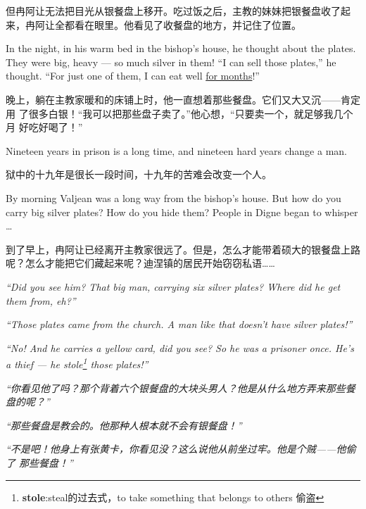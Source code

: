 \documentclass[fontset=ubuntu, zihao=5]{ctexart}
\begin{document}
\begin{paracol}{2}
  \switchcolumn
  但冉阿让无法把目光从银餐盘上移开。吃过饭之后，主教的妹妹把银餐盘收了起来，冉阿让全都看在眼里。他看见了收餐盘的地方，并记住了位置。

  \switchcolumn*

  In the night, in his warm bed in the bishop's house, he thought about the
  plates. They were big, heavy --- so much silver in them! ``I can sell
  those plates,'' he thought. ``For just one of them, I can eat well
  \uline{for months}!''

  \switchcolumn

  晚上，躺在主教家暖和的床铺上时，他一直想着那些餐盘。它们又大又沉——肯定用
  了很多白银！“我可以把那些盘子卖了。”他心想，“只要卖一个，就足够我几个月
  好吃好喝了！”

  \switchcolumn*

  Nineteen years in prison is a long time, and nineteen hard years change a man.

  \switchcolumn

  狱中的十九年是很长一段时间，十九年的苦难会改变一个人。

  \switchcolumn*

  \sectionbreak

  By morning Valjean was a long way from the bishop's house. But how do you carry big silver plates? How do you hide them? People in Digne began to whisper \ldots{}

  \switchcolumn

  \sectionbreak
  到了早上，冉阿让已经离开主教家很远了。但是，怎么才能带着硕大的银餐盘上路呢？怎么才能把它们藏起来呢？迪涅镇的居民开始窃窃私语……


  \switchcolumn*

  \emph{``Did you see him? That big man, carrying six silver plates? Where did he get them from, eh?''}

  \emph{``Those plates came from the church. A man like that doesn't have silver plates!''}

  \emph{``No! And he carries a yellow card, did you see? So he was a prisoner once.
  He's a thief --- he stole\footnote{\textbf{stole}:steal的过去式，to take
    something that belongs to others 偷盗} those plates!''}

  \switchcolumn

  \emph{“你看见他了吗？那个背着六个银餐盘的大块头男人？他是从什么地方弄来那些餐盘的呢？”}

  \emph{“那些餐盘是教会的。他那种人根本就不会有银餐盘！”}

  \emph{“不是吧！他身上有张黄卡，你看见没？这么说他从前坐过牢。他是个贼——他偷了
  那些餐盘！”}


\end{paracol}
\end{document}
